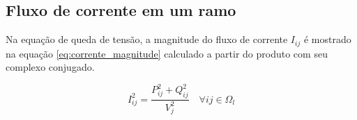 \subsection{Fluxo de corrente em um ramo}

Na equação de queda de tensão, a magnitude do fluxo de corrente $I_{ij}$ é mostrado na equação \ref{eq:corrente_magnitude} calculado a partir do produto com seu complexo conjugado.

\begin{equation}
    I_{ij}^{2} = \frac{P_{ij}^{2}+Q_{ij}^{2}}{V_{j}^{2}}\quad\forall ij \in \Omega_{l}
    \label{eq:corrente_magnitude}
\end{equation}
